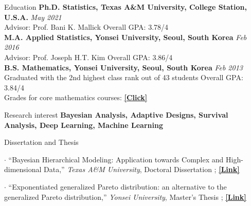 \documentclass{resume} %
\begin{document}

\begin{rSection}{Education}
{\bf Ph.D. Statistics, Texas A\&M University, College Station, U.S.A.} \hfill {\em May 2021} \\ 
Advisor: Prof. Bani K. Mallick
\hfill {Overall GPA: 3.78/4}\\
{\bf M.A. Applied Statistics, Yonsei University, Seoul, South Korea} \hfill {\em Feb 2016} \\ 
Advisor: Prof. Joseph H.T. Kim
\hfill {Overall GPA: 3.86/4}
\\
{\bf B.S. Mathematics, Yonsei University, Seoul, South Korea} \hfill {\em Feb 2013} \\ 
Graduated with the 2nd highest class rank out of 43 students
\hfill {Overall GPA: 3.84/4}\\
{Grades for core mathematics courses:
\href{https://www.dropbox.com/s/jjjwq3e69xloi96/subjects%28math%29.pdf?dl=0}
{\underline{\textbf{[Click]}}}}
\end{rSection}



\begin{rSection}{Research interest}
\textbf{Bayesian Analysis, Adaptive Designs, Survival Analysis, Deep Learning, Machine Learning}
\end{rSection}


\begin{rSection}{Dissertation and Thesis}
\item[$\cdot$] ``Bayesian Hierarchical Modeling: Application towards Complex and High-dimensional Data,''
\textit{Texas A\&M University}, Doctoral Dissertation
 ;
\href{https://oaktrust.library.tamu.edu/handle/1969.1/195691}{\underline{\textbf{[Link]}}}
\item[$\cdot$] ``Exponentiated generalized Pareto distribution: an alternative to the generalized Pareto distribution,''
\textit{Yonsei University}, Master's Thesis
;
\href{https://library.yonsei.ac.kr/search/detail/CAT000001777455?briefLink=/main/searchBrief?q=Seyoon+lee}{\underline{\textbf{[Link]}}}
\end{rSection}
\end{document}
